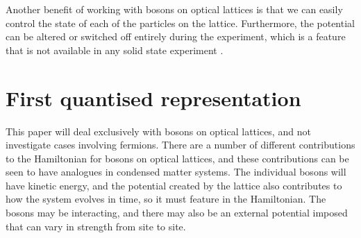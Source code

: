 \documentclass[a4paper,10pt]{article}
\theoremstyle{plain}
\begin{document}
Another benefit of working with bosons on optical lattices is that we can easily
control the state of each of the particles on the lattice. Furthermore, the
potential can be altered or switched off entirely during the experiment, which
is a feature that is not available in any solid state experiment
\cite{Morsch2006}.


\section{First quantised representation}

This paper will deal exclusively with bosons on optical lattices, and not
investigate cases involving fermions. There are a number of different
contributions to the Hamiltonian for bosons on optical lattices, and these
contributions can be seen to have analogues in condensed matter systems. The
individual bosons will have kinetic energy, and the potential created by the
lattice also contributes to how the system evolves in time, so it must feature
in the Hamiltonian. The bosons may be interacting, and there may also be an
external potential imposed that can vary in strength from site to site.
\end{document}
